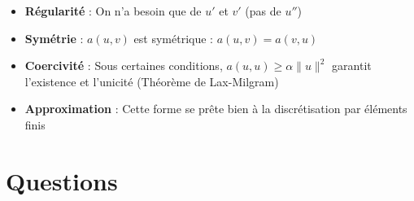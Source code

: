 \documentclass[11pt,a4paper]{report}
\begin{document}
\begin{itemize}
    \item \textbf{Régularité} : On n'a besoin que de $u' $ et $v'$ (pas de $u''$)
    \item \textbf{Symétrie} : $a(u,v)$ est symétrique : $a(u,v) = a(v,u)$
    \item \textbf{Coercivité} : Sous certaines conditions, $a(u,u) \geq \alpha \|u\|^2$ garantit l'existence et l'unicité (Théorème de Lax-Milgram)
    \item \textbf{Approximation} : Cette forme se prête bien à la discrétisation par éléments finis
\end{itemize}

\section*{Questions}
\end{document}
